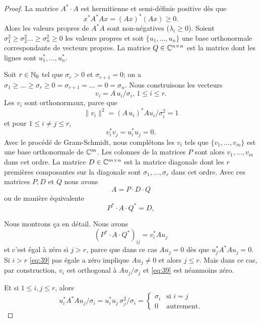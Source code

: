 \begin{proof}
  La matrice $A^* \cdot  A$ est hermitienne et semi-définie positive dès que
  \begin{displaymath}
    x^*A^*Ax = (Ax)^* (Ax) \geq 0. 
  \end{displaymath}
Alors les valeurs propres de $A^*A$ sont non-négatives ($\lambda_i\geq 0$). Soient $\sigma_1^2 \geq \sigma_2^2 \dots \geq \sigma_n^2\geq 0$ les valeurs propres et soit $\{u_1,\dots,u_n\}$ une base orthonormale  correspondante de vecteurs propres. La matrice $Q \in \mathbb{C}^{n \times n}$ est la matrice dont les lignes sont $u_1^*, \dots, u_n^*$. 

Soit $ r \in \mathbb{N}_0$ tel que $\sigma_r >0$ et $\sigma_{r+1} = 0$; on a $\sigma_1 \geq \ldots \geq \sigma_r \geq 0=\sigma_{r+1} = \ldots = 0=\sigma_n  $. Nous construisons les vecteurs 
\begin{displaymath}
  v_i = A \, u_i  / \sigma_i, \, 1 \leq i \leq r. 
\end{displaymath}
Les $v_i$ sont orthonormaux, parce que 
\begin{displaymath}
  \|v_i\|^2 = (A \, u_i)^* A u_i / \sigma_i^2 = 1
\end{displaymath}
et pour $1 \leq i\neq j \leq r$, 
\begin{displaymath}
  v_i^* v_j = u_i^* u_j = 0. 
\end{displaymath}
Avec le procédé de Gram-Schmidt, nous complétons les $v_i$ tels que $\{v_1,\dots,v_m\}$ est une base orthonormale de $\mathbb{C}^m$. Les colonnes de la matrices $P$ sont alors $v_1,\dots,v_m$ dans cet ordre. La matrice $D \in \mathbb{C}^{m\times n}$ est la matrice diagonale dont les $r$ premières composantes sur la diagonale sont $\sigma_1,\dots,\sigma_r$ dans cet ordre. Avec ces matrices  $P,D$ et $Q$ nous avons 
\begin{displaymath}
  A = P\cdot D \cdot Q 
\end{displaymath}
ou de manière équivalente 
\begin{displaymath}
  P^* \cdot A \cdot Q^* = D,
\end{displaymath}

Nous montrons  ça en détail. Nous avons 
\begin{equation}
  \label{eq:39}
     (P^* \cdot A \cdot Q^*)_{ij} = v_i^* A u_j 
\end{equation}
et c'est égal à zéro si $j > r$, parce que dans ce cas $A u_j =0$ dès que $u_j^*A^*Au_j = 0$.
Si $i>r$ \eqref{eq:39} pas égale  a zéro implique $A u_j \neq 0$ et alors $j≤r$. Mais dans ce cas, par construction, $v_i$ est orthogonal à  $A u_j / σ_j$ et \eqref{eq:39}  est néanmoins zéro. 


Et  si $1 ≤i,j \leq r$, alors 
\begin{displaymath}
  u_i^* A^* A u_j / \sigma_i = u_i^* u_j \,  \sigma_j^2 / \sigma_i=
  \begin{cases}
    \sigma_i & \text{si } i=j\\
    0 & \text{autrement}.  
  \end{cases}
\end{displaymath}
\end{proof}


